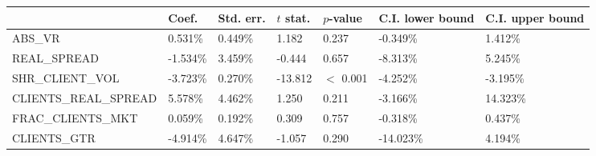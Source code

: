 \begin{tabular}{lllllll}
\toprule
{} &     Coef. & Std. err. & $t$ stat. &  $p$-value & C.I. lower bound & C.I. upper bound \\
\midrule
ABS\_VR               &   0.531\% &   0.449\% &     1.182 &      0.237 &         -0.349\% &          1.412\% \\
REAL\_SPREAD          &  -1.534\% &   3.459\% &    -0.444 &      0.657 &         -8.313\% &          5.245\% \\
SHR\_CLIENT\_VOL      &  -3.723\% &   0.270\% &   -13.812 &  $<$ 0.001 &         -4.252\% &         -3.195\% \\
CLIENTS\_REAL\_SPREAD &   5.578\% &   4.462\% &     1.250 &      0.211 &         -3.166\% &         14.323\% \\
FRAC\_CLIENTS\_MKT    &   0.059\% &   0.192\% &     0.309 &      0.757 &         -0.318\% &          0.437\% \\
CLIENTS\_GTR          &  -4.914\% &   4.647\% &    -1.057 &      0.290 &        -14.023\% &          4.194\% \\
\bottomrule
\end{tabular}
